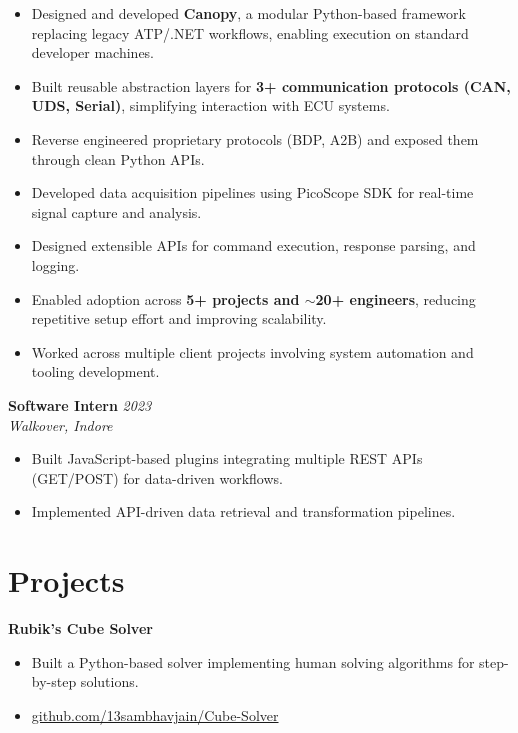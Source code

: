 \documentclass[a4paper,10pt]{article}
\begin{document}
\begin{itemize}
    \item Designed and developed \textbf{Canopy}, a modular Python-based framework replacing legacy ATP/.NET workflows, enabling execution on standard developer machines.
    
    \item Built reusable abstraction layers for \textbf{3+ communication protocols (CAN, UDS, Serial)}, simplifying interaction with ECU systems.
    
    \item Reverse engineered proprietary protocols (BDP, A2B) and exposed them through clean Python APIs.
    
    \item Developed data acquisition pipelines using PicoScope SDK for real-time signal capture and analysis.
    
    \item Designed extensible APIs for command execution, response parsing, and logging.
    
    \item Enabled adoption across \textbf{5+ projects and $\sim$20+ engineers}, reducing repetitive setup effort and improving scalability.
    
    \item Worked across multiple client projects involving system automation and tooling development.
\end{itemize}

\noindent
\textbf{Software Intern} \hfill \textit{2023} \\
\textit{Walkover, Indore}

\begin{itemize}
    \item Built JavaScript-based plugins integrating multiple REST APIs (GET/POST) for data-driven workflows.
    
    \item Implemented API-driven data retrieval and transformation pipelines.
\end{itemize}

\section*{Projects}

\noindent\textbf{Rubik’s Cube Solver}
\begin{itemize}
    \item Built a Python-based solver implementing human solving algorithms for step-by-step solutions.
    \item \href{https://github.com/13sambhavjain/Cube-Solver}{github.com/13sambhavjain/Cube-Solver}
\end{itemize}
\end{document}
